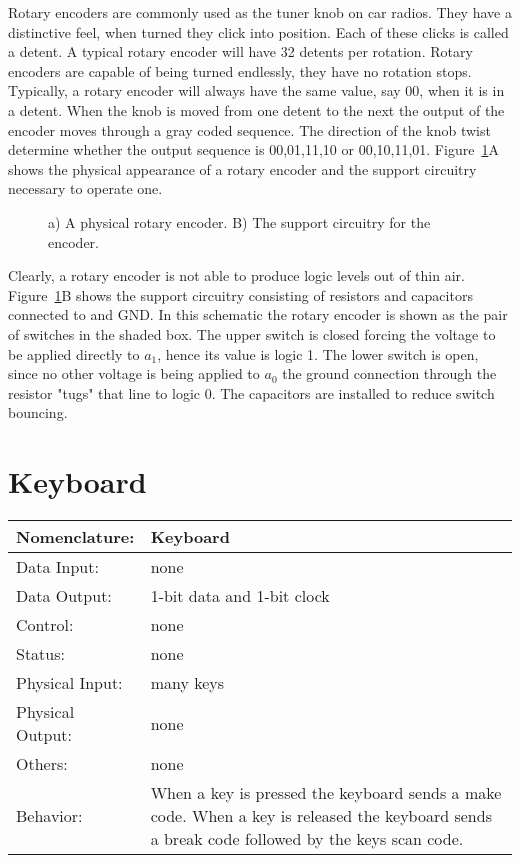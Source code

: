 Rotary encoders are commonly used as the tuner knob on car radios.
They have a distinctive feel, when turned they click into 
position.  Each of these clicks is called a detent.   A typical
rotary encoder will have 32 detents per rotation.  Rotary encoders 
are capable of being turned endlessly,
they have no rotation stops.  Typically, a rotary encoder will always have the
same value, say 00, when it is in a detent.  When the knob is moved 
from one detent to the next the output of the encoder moves through
a gray coded sequence.  The direction of the knob twist determine whether the
output sequence is 00,01,11,10 or 00,10,11,01.    
Figure~\ref{fig:commonPeripheralComponentsencoder}A shows the physical appearance of a rotary 
encoder and the support circuitry necessary to operate one.

\begin{figure}[ht]
\caption{a) A physical rotary encoder.  B) The support circuitry for
the encoder.}
\label{fig:commonPeripheralComponentsencoder}
\end{figure}

Clearly, a rotary encoder is not able to produce logic levels out 
of thin air.   Figure~\ref{fig:commonPeripheralComponentsencoder}B shows the support 
circuitry consisting of resistors and capacitors connected to 
\VCC and GND.  In this schematic the rotary encoder is shown as the
pair of switches in the shaded box.  The upper switch is closed
forcing the voltage \VCC to be applied directly to $a_1$, hence its
value is logic 1.  The lower switch is open, since no other voltage 
is being applied to $a_0$ the ground connection through the resistor 
"tugs" that line to logic 0.  The capacitors are installed to reduce 
switch bouncing.

\section{Keyboard}
\label{page:keyboad}
\begin{tabular}{|l|p{3.5in}|} \hline
Nomenclature:  & Keyboard                           \\ \hline
Data Input:    & none        \\ \hline
Data Output:   & 1-bit data and 1-bit clock   \\ \hline
Control:       & none           \\ \hline
Status:        & none                                   \\ \hline
Physical Input:& many keys		\\ \hline
Physical Output:& none		\\ \hline
Others:        & none                   \\ \hline
Behavior:      & When a key is pressed the keyboard sends a make code.
When a key is released the keyboard sends a break code followed by the
keys scan code. \\ \hline
\end{tabular}

